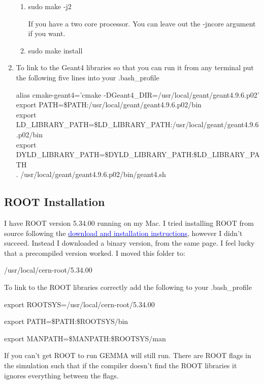 \documentclass[letter,12pt]{article}
\newcommand{\filefont}[1]{{\fontfamily{pnc}\selectfont #1}\xspace}
\newcommand{\hrefcolor}[2]{\href{#1}{\textcolor{blue}{#2}}\xspace}
\begin{document}
\begin{enumerate}
\begin{enumerate}[i]
\item \filefont{sudo make -j2}

If you have a two core processor. You can leave out the \filefont{-jncore} argument if you want.
\item \filefont{sudo make install}

\end{enumerate}

\item To link to the Geant4 libraries so that you can run it from any terminal put the following five lines into your \filefont{.bash\_profile}

\filefont{\small alias cmake-geant4='cmake -DGeant4\_DIR=/usr/local/geant/geant4.9.6.p02'\\
export PATH=\$PATH:/usr/local/geant/geant4.9.6.p02/bin\\
export LD\_LIBRARY\_PATH=\$LD\_LIBRARY\_PATH:/usr/local/geant/geant4.9.6.p02/bin\\
export DYLD\_LIBRARY\_PATH=\$DYLD\_LIBRARY\_PATH:\$LD\_LIBRARY\_PATH\\
. /usr/local/geant/geant4.9.6.p02/bin/geant4.sh}

\end{enumerate}

\subsection{ROOT Installation}

I have ROOT version 5.34.00 running on my Mac. I tried installing ROOT from source following the \hrefcolor{http://root.cern.ch/drupal/content/production-version-534}{download and installation instructions}, however I didn't succeed. Instead I downloaded a binary version, from the same page. I feel lucky that a precompiled version worked. I moved this folder to:

\filefont{/usr/local/cern-root/5.34.00}

To link to the ROOT libraries correctly add the following to your \filefont{.bash\_profile}

\filefont{export ROOTSYS=/usr/local/cern-root/5.34.00

export PATH=\$PATH:\$ROOTSYS/bin

export MANPATH=\$MANPATH:\$ROOTSYS/man}

If you can't get ROOT to run GEMMA will still run. There are ROOT flags in the simulation such that if the compiler doesn't find the ROOT libraries it ignores everything between the flags.
\end{document}

